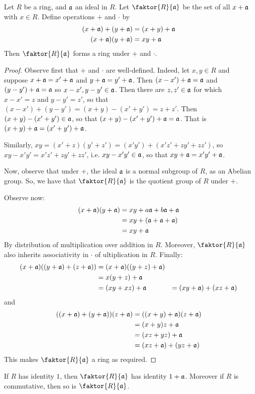 \begin{theorem}\label{theorem_5.3.3}
  Let $R$ be a ring, and $\mathfrak{a}$ an ideal in $R$. Let  $\faktor{R}{\af}$ be the set
  of all $x+\mathfrak{a}$ with  $x \in R$. Define operations $+$ and $\cdot$ by
  \begin{align*}
    (x+\mathfrak{a})+(y+\mathfrak{a}) &=  (x+y)+\mathfrak{a} \\
    (x+\mathfrak{a})(y+\mathfrak{a})  &=  xy+\mathfrak{a}    \\
  \end{align*}
  Then $\faktor{R}{\af}$ forms a ring under $+$ and $\cdot$.
\end{theorem}
\begin{proof}
  Observe first that $+$ and $\cdot$ are well-defined. Indeed, let
  $x,y \in R$ and suppose $x+\mathfrak{a}=x'+\mathfrak{a}$ and $y+\mathfrak{a}=y'+\mathfrak{a}$. Then
  $(x-x')+\mathfrak{a}=\mathfrak{a}$ and $(y-y')+\mathfrak{a}=\mathfrak{a}$ so $x-x',y-y' \in \mathfrak{a}$. Then
  there are $z,z' \in \mathfrak{a}$ for which $x-x'=z$ and $y-y'=z'$, so that
  $(x-x')+(y-y')=(x+y)-(x'+y')=z+z'$. Then $(x+y)-(x'+y') \in \mathfrak{a}$, so
  that $(x+y)-(x'+y')+\mathfrak{a}=\mathfrak{a}$. That is $(x+y)+\mathfrak{a}=(x'+y')+\mathfrak{a}$.

  Similarly, $xy=(x'+z)(y'+z')=(x'y')+(x'z'+zy'+zz')$, so
  $xy-x'y'=x'z'+zy'+zz'$, i.e. $xy-x'y' \in \mathfrak{a}$, so that
  $xy+\mathfrak{a}=x'y'+\mathfrak{a}$.

  Now, observe that under $+$, the ideal $\mathfrak{a}$ is a normal subgroup of
  $R$, as an Abelian group. So, we have that $\faktor{R}{\af}$ is the
  quotient group of $R$ under $+$.

  Observe now:
  \begin{align*}
    (x+\mathfrak{a})(y+\mathfrak{a})  &=  xy+a\mathfrak{a}+b\mathfrak{a}+\mathfrak{a} \\
                    &=  xy+(\mathfrak{a}+\mathfrak{a}+\mathfrak{a})  \\
                    &=  xy+\mathfrak{a}  \\
  \end{align*}
  By distribution of multiplication over addition in $R$. Moreover,
  $\faktor{R}{\af}$ also inherits associativity in $\cdot$ of ultiplication in
  $R$. Finally:
  \begin{align*}
    (x+\mathfrak{a})((y+\mathfrak{a})+(z+\mathfrak{a}))  &=  (x+\mathfrak{a})((y+z)+\mathfrak{a})  \\
        &= x(y+z)+\mathfrak{a} \\
        &=  (xy+xz)+\mathfrak{a}
        &=  (xy+\mathfrak{a})+(xz+\mathfrak{a}) \\
  \end{align*}
  and
  \begin{align*}
    ((x+\mathfrak{a})+(y+\mathfrak{a}))(z+\mathfrak{a})  &=  ((x+y)+\mathfrak{a})(z+\mathfrak{a})  \\
      &=  (x+y)z+\mathfrak{a}  \\
      &=  (xz+yz)+\mathfrak{a} \\
      &=  (xz+\mathfrak{a})+(yz+\mathfrak{a}) \\
  \end{align*}
  This makes $\faktor{R}{\af}$ a ring as required.
\end{proof}
\begin{corollary}
  If $R$ has identity $1$, then $\faktor{R}{\af}$ has identity
  $1+\mathfrak{a}$. Moreover if  $R$ is commutative, then so is $\faktor{R}{\af}$.
\end{corollary}

